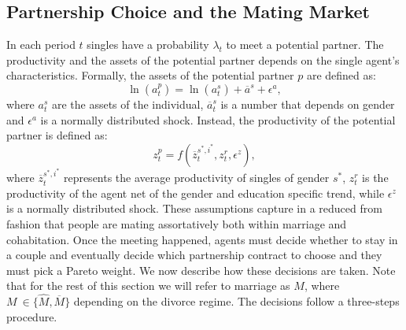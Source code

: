 \documentclass[12pt]{article}
\numberwithin{table}{section}
\begin{document}
\subsection{Partnership Choice and the Mating Market}\label{ssec:marriage_market}
In each period $t$ singles have a probability $\lambda_t$ to meet a potential partner. The productivity and the assets of the potential partner depends on the single agent's characteristics. Formally, the assets of the potential partner $p$ are defined as:
\begin{equation}\label{eq:mma}
\ln(a^p_t)=\ln(a^s_t)+\overline{a}^{s}+\epsilon^a,
\end{equation}
where $a^s_t$ are the assets of the individual, $\overline{a}^{s}_t$ is a number that depends on gender and $\epsilon^a$ is a normally distributed shock. Instead, the productivity of the potential partner is defined as:
\begin{equation}\label{eq:mmz}
z_t^p=f(\overline{z}^{s^*,i^*}_t,z^r_t,\epsilon^z),
\end{equation}
where $\overline{z}^{s^*,i^*}_t$ represents the average productivity of singles of gender $s^*$,  $z^r_t$ is the productivity of the agent net of the gender and education specific trend, while $\epsilon^z$ is a normally distributed shock. These assumptions capture in a reduced from fashion that people are mating assortatively both within marriage and cohabitation.
Once the meeting happened, agents must decide whether to stay in a couple and eventually decide which partnership contract to choose and they must pick a Pareto weight. We now describe how these decisions are taken. Note that for the rest of this section we will refer to marriage as $M$, where $M \ \in\{\hat{M},\overline{M}\}$ depending on the divorce regime. The decisions follow a three-steps procedure. 
\end{document}

